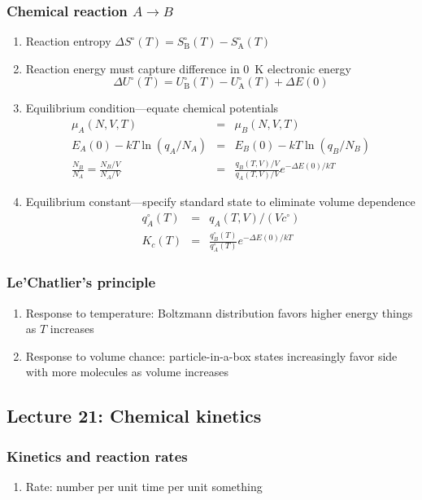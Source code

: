 \documentclass[11pt]{article}
\begin{document}
\subsubsection{Chemical reaction \(A \rightarrow B\)}
\label{sec:orgaf81491}
\begin{enumerate}
\item Reaction entropy \(\Delta S^\circ (T) =  S^\circ_\mathrm{B}(T)-S^\circ_\mathrm{A}(T)\)
\item Reaction energy must capture difference in \SI{0}{K} electronic energy
  \begin{displaymath}
\Delta U^\circ (T) = U^\circ_\mathrm{B}(T)-U^\circ_\mathrm{A}(T)+\Delta E(0)
   \end{displaymath}
\item Equilibrium condition---equate chemical potentials
  \begin{eqnarray*}
 \mu_A(N,V,T) & = & \mu_B(N,V,T) \\
 E_A(0) - k T \ln (q_A/N_A) & = & E_B(0) - k T \ln (q_B/N_B) \\
\frac{N_B}{N_A} =  \frac{N_B/V}{N_A/V} & = &\frac{q_B(T,V)/V}{q_A(T,V)/V} e^{-\Delta E(0)/kT}
  \end{eqnarray*}
\item Equilibrium constant---specify standard state to eliminate volume dependence
 \begin{eqnarray*}
  q_A^\circ(T) & = & q_A(T,V)/(V c^\circ) \\
K_c(T) & = &\frac{q_B^\circ(T)}{q_A^\circ(T)} e^{-\Delta E(0)/kT}
 \end{eqnarray*}
\end{enumerate}
\subsubsection{Le'Chatlier's principle}
\label{sec:orgb0be066}
\begin{enumerate}
\item Response to temperature: Boltzmann distribution favors higher energy things as \(T\) increases
\item Response to volume chance: particle-in-a-box states increasingly favor side with more molecules as volume increases
\end{enumerate}

\subsection{Lecture 21: Chemical kinetics}
\label{sec:org7945b6b}
\subsubsection{Kinetics and reaction rates}
\label{sec:orgba30d15}
\begin{enumerate}
\item Rate: number per unit time per unit something
\end{enumerate}
\end{document}
